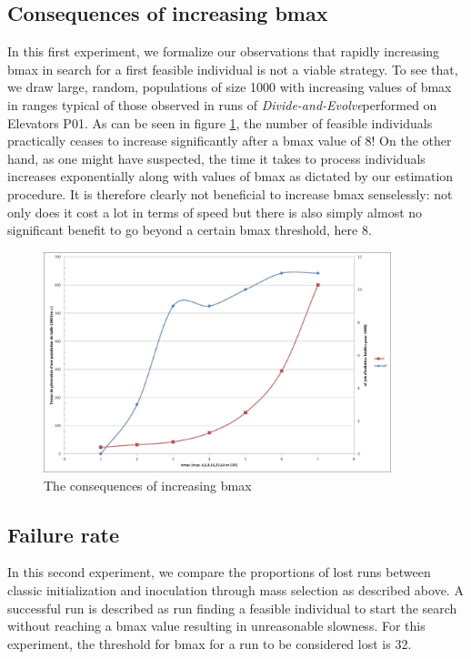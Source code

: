 \documentclass[english]{DESCARWINreport}
\newcommand{\dae}{{\em Divide-and-Evolve}}
\begin{document}
\subsection{Consequences of increasing bmax}

In this first experiment, we formalize our observations that rapidly increasing bmax in search for a first feasible individual is not a viable strategy. To see that, we draw large, random, populations of size 1000 with increasing values of bmax in ranges typical of those observed in runs of \dae  performed on Elevators P01. As can be seen in figure \ref{fig:bmax}, the number of feasible individuals practically ceases to increase significantly after a bmax value of 8! On the other hand, as one might have suspected, the time it takes to process individuals increases exponentially along with values of bmax as dictated by our estimation procedure. It is therefore clearly not beneficial to increase bmax senselessly: not only does it cost a lot in terms of speed but there is also simply almost no significant benefit to go beyond a certain bmax threshold, here 8.

\begin{figure}
	\centering
		\includegraphics[width=0.9\textwidth]{pics/bmax.eps}
	\caption{The consequences of increasing bmax}
	\label{fig:bmax}
\end{figure}

\subsection{Failure rate}

In this second experiment, we compare the proportions of lost runs between classic initialization and inoculation through mass selection as described above. A successful run is described as run finding a feasible individual to start the search without reaching a bmax value resulting in unreasonable slowness. For this experiment, the threshold for bmax for a run to be considered lost is 32.
\end{document}
